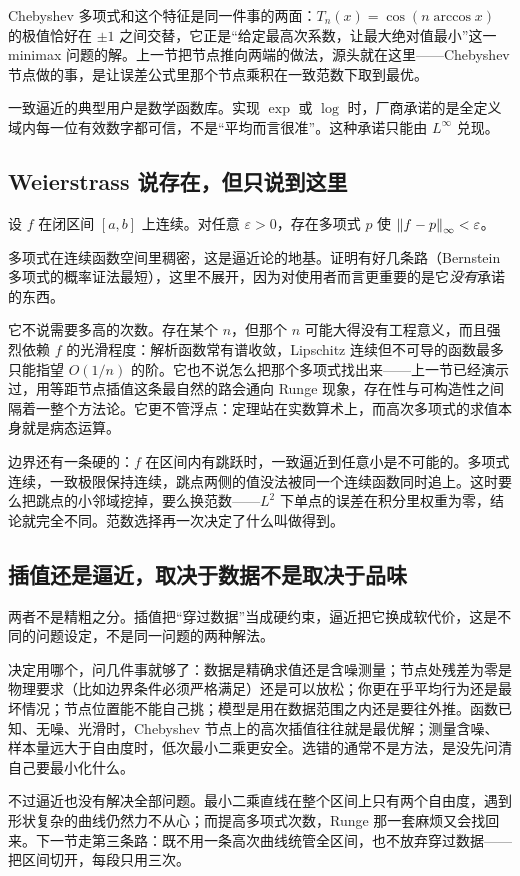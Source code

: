 Chebyshev 多项式和这个特征是同一件事的两面：\(T_n(x)=\cos(n\arccos x)\) 的极值恰好在 \(\pm1\) 之间交替，它正是``给定最高次系数，让最大绝对值最小''这一 minimax 问题的解。上一节把节点推向两端的做法，源头就在这里——Chebyshev 节点做的事，是让误差公式里那个节点乘积在一致范数下取到最优。

一致逼近的典型用户是数学函数库。实现 \(\exp\) 或 \(\log\) 时，厂商承诺的是全定义域内每一位有效数字都可信，不是``平均而言很准''。这种承诺只能由 \(L^\infty\) 兑现。

\subsection{Weierstrass 说存在，但只说到这里}

\begin{theorem}
设 \(f\) 在闭区间 \([a,b]\) 上连续。对任意 \(\varepsilon>0\)，存在多项式 \(p\) 使 \(\left\lVert f-p\right\rVert_\infty<\varepsilon\)。
\end{theorem}

多项式在连续函数空间里稠密，这是逼近论的地基。证明有好几条路（Bernstein 多项式的概率证法最短），这里不展开，因为对使用者而言更重要的是它\emph{没有}承诺的东西。

它不说需要多高的次数。存在某个 \(n\)，但那个 \(n\) 可能大得没有工程意义，而且强烈依赖 \(f\) 的光滑程度：解析函数常有谱收敛，Lipschitz 连续但不可导的函数最多只能指望 \(O(1/n)\) 的阶。它也不说怎么把那个多项式找出来——上一节已经演示过，用等距节点插值这条最自然的路会通向 Runge 现象，存在性与可构造性之间隔着一整个方法论。它更不管浮点：定理站在实数算术上，而高次多项式的求值本身就是病态运算。

边界还有一条硬的：\(f\) 在区间内有跳跃时，一致逼近到任意小是不可能的。多项式连续，一致极限保持连续，跳点两侧的值没法被同一个连续函数同时追上。这时要么把跳点的小邻域挖掉，要么换范数——\(L^2\) 下单点的误差在积分里权重为零，结论就完全不同。范数选择再一次决定了什么叫做得到。

\subsection{插值还是逼近，取决于数据不是取决于品味}

两者不是精粗之分。插值把``穿过数据''当成硬约束，逼近把它换成软代价，这是不同的问题设定，不是同一问题的两种解法。

决定用哪个，问几件事就够了：数据是精确求值还是含噪测量；节点处残差为零是物理要求（比如边界条件必须严格满足）还是可以放松；你更在乎平均行为还是最坏情况；节点位置能不能自己挑；模型是用在数据范围之内还是要往外推。函数已知、无噪、光滑时，Chebyshev 节点上的高次插值往往就是最优解；测量含噪、样本量远大于自由度时，低次最小二乘更安全。选错的通常不是方法，是没先问清自己要最小化什么。

不过逼近也没有解决全部问题。最小二乘直线在整个区间上只有两个自由度，遇到形状复杂的曲线仍然力不从心；而提高多项式次数，Runge 那一套麻烦又会找回来。下一节走第三条路：既不用一条高次曲线统管全区间，也不放弃穿过数据——把区间切开，每段只用三次。
